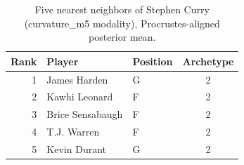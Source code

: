 \begin{table}[htbp]
  \centering\small
  \begin{tabular}{rllc}
    \toprule
    Rank & Player & Position & Archetype \\
    \midrule
    1 & James Harden & G & 2 \\
    2 & Kawhi Leonard & F & 2 \\
    3 & Brice Sensabaugh & F & 2 \\
    4 & T.J. Warren & F & 2 \\
    5 & Kevin Durant & G & 2 \\
    \bottomrule
  \end{tabular}
  \caption{Five nearest neighbors of Stephen Curry (curvature_m5 modality), Procrustes-aligned posterior mean.}
  \label{tab:Stephen_Curry_neighbors_curvature_m5}
\end{table}

